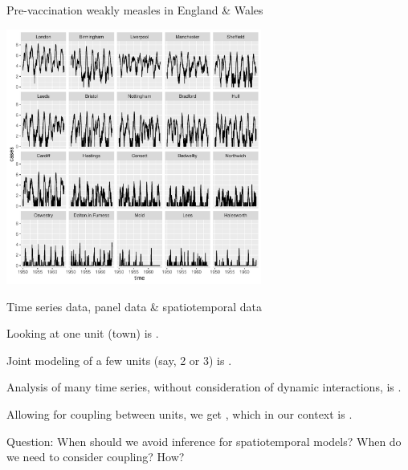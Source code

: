 \documentclass{beamer}
\begin{document}
\begin{frame}{Pre-vaccination weakly measles in England \& Wales}

\vspace{-2mm}

\begin{center}
\includegraphics[width=8.4cm]{he10-data.pdf}


\end{center}

\vspace{-2mm}
  
\end{frame}

\begin{frame}{Time series data, panel data \& spatiotemporal data}

  \bi
\item Looking at one unit (town) is .

  \item Joint modeling of a few units (say, 2 or 3) is .

\item Analysis of many time series, without consideration of dynamic interactions, is .

\item Allowing for coupling between units, we get , which in our context is .

  \ei

\vspace{3mm}
  
Question: When should we avoid inference for spatiotemporal models? When do we need to consider coupling? How?

\end{frame}
\end{document}
